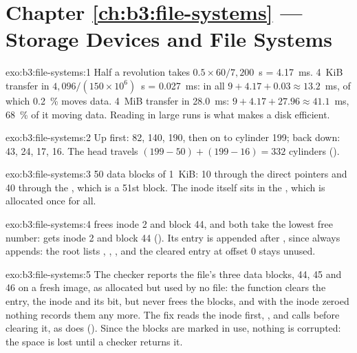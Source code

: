 \section*{Chapter \ref{ch:b3:file-systems} --- Storage Devices and File Systems}

\begin{solution}{exo:b3:file-systems:1}
Half a revolution takes $0.5 \times 60/7{,}200$~s = 4.17~ms. 4~KiB transfer in $4{,}096/(150 \times 10^6)$~s = 0.027~ms: in all $9 + 4.17 + 0.03 \approx 13.2$~ms, of which 0.2~\% moves data. 4~MiB transfer in 28.0~ms: $9 + 4.17 + 27.96 \approx 41.1$~ms, 68~\% of it moving data. Reading in large runs is what makes a disk efficient.
\end{solution}

\begin{solution}{exo:b3:file-systems:2}
Up first: 82, 140, 190, then on to cylinder 199; back down: 43, 24, 17, 16. The head travels $(199 - 50) + (199 - 16) = 332$ cylinders ().
\end{solution}

\begin{solution}{exo:b3:file-systems:3}
50 data blocks of 1~KiB: 10 through the direct pointers and 40 through the , which is a 51st block. The inode itself sits in the , which is allocated once for all.
\end{solution}

\begin{solution}{exo:b3:file-systems:4}
 frees inode 2 and block 44, and both  take the lowest free number:  gets inode 2 and block 44 (). Its entry is appended after , since  always appends: the root lists , , , and the cleared entry at offset 0 stays unused.
\end{solution}

\begin{solution}{exo:b3:file-systems:5}
The checker reports the file's three data blocks, 44, 45 and 46 on a fresh image, as allocated but used by no file: the function clears the entry, the inode and its bit, but never frees the blocks, and with the inode zeroed nothing records them any more. The fix reads the inode first, , and calls  before clearing it, as  does (). Since the blocks are marked in use, nothing is corrupted: the space is lost until a checker returns it.
\end{solution}

